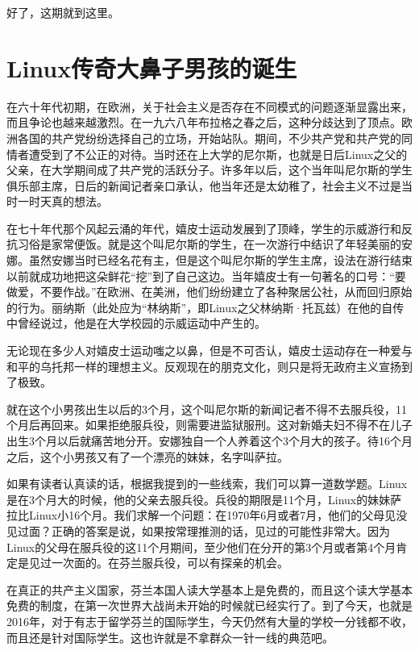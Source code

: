 \documentclass[
  letterpaper,
  DIV=11,
  numbers=noendperiod]{scrreprt}
\begin{document}
好了，这期就到这里。


\chapter{Linux传奇大鼻子男孩的诞生}\label{linuxux4f20ux5947ux5927ux9f3bux5b50ux7537ux5b69ux7684ux8bdeux751f}

在六十年代初期，在欧洲，关于社会主义是否存在不同模式的问题逐渐显露出来，而且争论也越来越激烈。在一九六八年布拉格之春之后，这种分歧达到了顶点。欧洲各国的共产党纷纷选择自己的立场，开始站队。期间，不少共产党和共产党的同情者遭受到了不公正的对待。当时还在上大学的尼尔斯，也就是日后Linux之父的父亲，在大学期间成了共产党的活跃分子。许多年以后，这个当年叫尼尔斯的学生俱乐部主席，日后的新闻记者亲口承认，他当年还是太幼稚了，社会主义不过是当时一时天真的想法。

在七十年代那个风起云涌的年代，嬉皮士运动发展到了顶峰，学生的示威游行和反抗习俗是家常便饭。就是这个叫尼尔斯的学生，在一次游行中结识了年轻美丽的安娜。虽然安娜当时已经名花有主，但是这个叫尼尔斯的学生主席，设法在游行结束以前就成功地把这朵鲜花``挖''到了自己这边。当年嬉皮士有一句著名的口号：``要做爱，不要作战。''在欧洲、在美洲，他们纷纷建立了各种聚居公社，从而回归原始的行为。丽纳斯（此处应为``林纳斯''，即Linux之父林纳斯·托瓦兹）在他的自传中曾经说过，他是在大学校园的示威运动中产生的。

无论现在多少人对嬉皮士运动嗤之以鼻，但是不可否认，嬉皮士运动存在一种爱与和平的乌托邦一样的理想主义。反观现在的朋克文化，则只是将无政府主义宣扬到了极致。

就在这个小男孩出生以后的3个月，这个叫尼尔斯的新闻记者不得不去服兵役，11个月后再回来。如果拒绝服兵役，则需要进监狱服刑。这对新婚夫妇不得不在儿子出生3个月以后就痛苦地分开。安娜独自一个人养着这个3个月大的孩子。待16个月之后，这个小男孩又有了一个漂亮的妹妹，名字叫萨拉。

如果有读者认真读的话，根据我提到的一些线索，我们可以算一道数学题。Linux是在3个月大的时候，他的父亲去服兵役。兵役的期限是11个月，Linux的妹妹萨拉比Linux小16个月。我们求解一个问题：在1970年6月或者7月，他们的父母见没见过面？正确的答案是说，如果按常理推测的话，见过的可能性非常大。因为Linux的父母在服兵役的这11个月期间，至少他们在分开的第3个月或者第4个月肯定是见过一次面的。在芬兰服兵役，可以有探亲的机会。

在真正的共产主义国家，芬兰本国人读大学基本上是免费的，而且这个读大学基本免费的制度，在第一次世界大战尚未开始的时候就已经实行了。到了今天，也就是2016年，对于有志于留学芬兰的国际学生，今天仍然有大量的学校一分钱都不收，而且还是针对国际学生。这也许就是不拿群众一针一线的典范吧。
\end{document}
